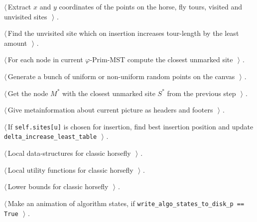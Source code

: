 \documentclass[11.5pt]{report}
\begin{document}
{\begin{list}{}{\setlength{\itemsep}{-\parsep}\setlength{\itemindent}{-\leftmargin}}
\item $\langle\,$Extract $x$ and $y$ coordinates of the points on the horse, fly tours, visited and unvisited sites\nobreak\ {\footnotesize {}}$\,\rangle$ {\footnotesize {\NWtxtRefIn} .}
\item $\langle\,$Find the unvisited site which on insertion increases tour-length by the least amount\nobreak\ {\footnotesize {}}$\,\rangle$ {\footnotesize {\NWtxtRefIn} .}
\item $\langle\,$For each node in current $\varphi$-Prim-MST compute the closest unmarked site\nobreak\ {\footnotesize {}}$\,\rangle$ {\footnotesize {\NWtxtRefIn} .}
\item $\langle\,$Generate a bunch of uniform or non-uniform random points on the canvas\nobreak\ {\footnotesize {}}$\,\rangle$ {\footnotesize {\NWtxtRefIn} .}
\item $\langle\,$Get the node $M^{*}$ with the closest unmarked site $S^{*}$ from the previous step\nobreak\ {\footnotesize {}}$\,\rangle$ {\footnotesize {\NWtxtRefIn} .}
\item $\langle\,$Give metainformation about current picture as headers and footers\nobreak\ {\footnotesize {}}$\,\rangle$ {\footnotesize {\NWtxtRefIn} .}
\item $\langle\,$If \texttt{self.sites[u]} is chosen for insertion, find best insertion position and update \texttt{delta\_increase\_least\_table}\nobreak\ {\footnotesize {}}$\,\rangle$ {\footnotesize {\NWtxtRefIn} .}
\item $\langle\,$Local data-structures for classic horsefly\nobreak\ {\footnotesize {}}$\,\rangle$ {\footnotesize {\NWtxtRefIn} .}
\item $\langle\,$Local utility functions for classic horsefly\nobreak\ {\footnotesize {}}$\,\rangle$ {\footnotesize {\NWtxtRefIn} .}
\item $\langle\,$Lower bounds for classic horsefly\nobreak\ {\footnotesize {}}$\,\rangle$ {\footnotesize {\NWtxtRefIn} .}
\item $\langle\,$Make an animation of algorithm states, if \verb|write_algo_states_to_disk_p == True|\nobreak\ {\footnotesize {}}$\,\rangle$ {\footnotesize {\NWtxtRefIn} .}

\end{list}}
\end{document}
